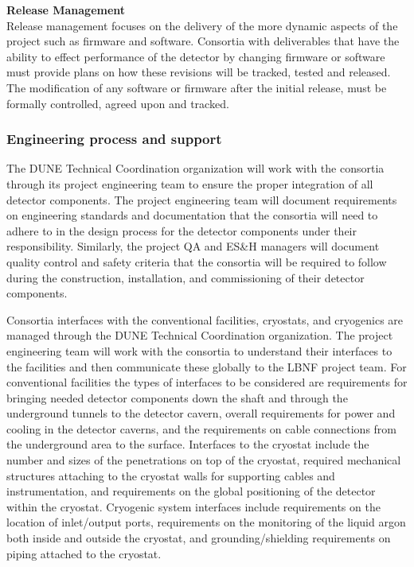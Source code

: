 {\bf Release Management}\\
Release management focuses on the delivery of the more dynamic aspects
of the project such as firmware and software.  Consortia with
deliverables that have the ability to effect performance of the
detector by changing firmware or software must provide plans on how
these revisions will be tracked, tested and released.  The
modification of any software or firmware after the initial release,
must be formally controlled, agreed upon and tracked.


\subsubsection{Engineering process and support}
\label{sec:fdsp-coord-integ-engr-proc}
 

The DUNE Technical Coordination organization will work with the
consortia through its project engineering team to ensure the proper
integration of all detector components.  The project engineering team
will document requirements on engineering standards and documentation
that the consortia will need to adhere to in the design process for
the detector components under their responsibility.  Similarly, the
project QA and ES\&H managers will document quality control and safety
criteria that the consortia will be required to follow during the
construction, installation, and commissioning of their detector
components.


Consortia interfaces with the conventional facilities, cryostats, and
cryogenics are managed through the DUNE Technical Coordination
organization.  The project engineering team will work with the
consortia to understand their interfaces to the facilities and then
communicate these globally to the LBNF project team.  For conventional
facilities the types of interfaces to be considered are requirements
for bringing needed detector components down the shaft and through the
underground tunnels to the detector cavern, overall requirements for
power and cooling in the detector caverns, and the requirements on
cable connections from the underground area to the surface.
Interfaces to the cryostat include the number and sizes of the
penetrations on top of the cryostat, required mechanical structures
attaching to the cryostat walls for supporting cables and
instrumentation, and requirements on the global positioning of the
detector within the cryostat.  Cryogenic system interfaces include
requirements on the location of inlet/output ports, requirements on
the monitoring of the liquid argon both inside and outside the
cryostat, and grounding/shielding requirements on piping attached to
the cryostat.

